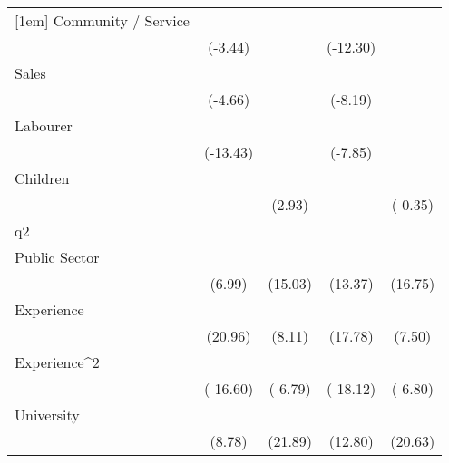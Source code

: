 {\begin{tabular}{l*{4}{c}}
[1em]
Community / Service &            \sym{***}&                     &            \sym{***}&                     \\
                    &     (-3.44)         &                     &    (-12.30)         &                     \\
[1em]
Sales               &            \sym{***}&                     &            \sym{***}&                     \\
                    &     (-4.66)         &                     &     (-8.19)         &                     \\
[1em]
Labourer            &            \sym{***}&                     &            \sym{***}&                     \\
                    &    (-13.43)         &                     &     (-7.85)         &                     \\
[1em]
Children            &                     &            \sym{**} &                     &                     \\
                    &                     &      (2.93)         &                     &     (-0.35)         \\
\hline
q2                  &                     &                     &                     &                     \\
Public Sector       &            \sym{***}&            \sym{***}&            \sym{***}&            \sym{***}\\
                    &      (6.99)         &     (15.03)         &     (13.37)         &     (16.75)         \\
[1em]
Experience          &            \sym{***}&            \sym{***}&            \sym{***}&            \sym{***}\\
                    &     (20.96)         &      (8.11)         &     (17.78)         &      (7.50)         \\
[1em]
Experience^{2}      &            \sym{***}&            \sym{***}&            \sym{***}&            \sym{***}\\
                    &    (-16.60)         &     (-6.79)         &    (-18.12)         &     (-6.80)         \\
[1em]
University          &            \sym{***}&            \sym{***}&            \sym{***}&            \sym{***}\\
                    &      (8.78)         &     (21.89)         &     (12.80)         &     (20.63)         \\

\end{tabular}}
